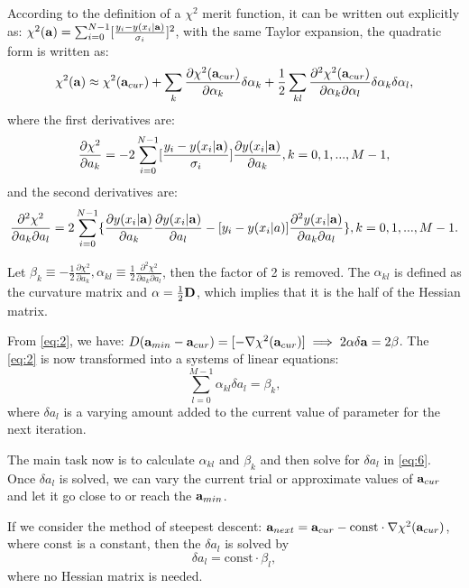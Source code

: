 According to the definition of a $\chi^2$ merit function, it can be written out explicitly as:
$\chi^2({\bf a})=\sum_{i=0}^{N-1}[\frac{y_i-y(x_i|{\bf a})}{\sigma_i}]^2$, with the same Taylor expansion, the quadratic form is written as:
\begin{equation}\label{eq:3}
\chi^2({\bf a})\approx\chi^2({\bf a}_{cur})+\sum_k\frac{\partial \chi^2({\bf a}_{cur})}{\partial \alpha_k}\delta\alpha_k+\frac{1}{2}\sum_{kl}\frac{\partial^2\chi^2({\bf a}_{cur})}{\partial\alpha_k\partial\alpha_l}\delta\alpha_k\delta\alpha_l, 
\end{equation}
where the first derivatives are:
\begin{equation}\label{eq:4}
\frac{\partial \chi^2}{\partial a_k}=-2\sum_{i=0}^{N-1}[\frac{y_i-y(x_i|{\bf a})}{\sigma_i}]\frac{\partial y(x_i|{\bf a})}{\partial a_k}, k = 0,1,...,M-1,
\end{equation}
and the second derivatives are:
\begin{equation}\label{eq:5}
\frac{\partial^2 \chi^2}{\partial a_k\partial a_l}=2\sum_{i=0}^{N-1}\{\frac{\partial y(x_i|{\bf a})}{\partial a_k}\frac{\partial y(x_i|{\bf a})}{\partial a_l}-[y_i-y(x_i|a)]\frac{\partial^2 y(x_i|{\bf a})}{\partial a_k\partial a_l}\}, k = 0, 1, ..., M-1.
\end{equation}

Let $\beta_k\equiv-\frac{1}{2}\frac{\partial\chi^2}{\partial a_k}, \alpha_{kl}\equiv \frac{1}{2}\frac{\partial^2\chi^2}{\partial a_k\partial a_l}$, then the factor of 2 is removed. The $\alpha_{kl}$ is defined as the curvature matrix and ${\bf \alpha}=\frac{1}{2}{\bf D}$, which implies that it is the half of the Hessian matrix.

From \ref{eq:2}, we have: $D({\bf a}_{min}-{\bf a}_{cur}) = [-\nabla\chi^2({\bf a}_{cur})]\implies 2{\bf\alpha\delta a}= 2{\bf\beta}$. The \ref{eq:2} is now transformed into a systems of linear equations:
\begin{equation}\label{eq:6}
\sum_{l=0}^{M-1}\alpha_{kl}\delta a_l = \beta_k,
\end{equation} where $\delta a_l$ is 
a varying amount added to the current value of parameter for the next iteration. 

The main task now is to calculate $\alpha_{kl}$ and $\beta_k$ and then solve for $\delta a_l$ in \ref{eq:6}. Once $\delta a_l$ is solved, we can vary the current trial or approximate values of ${\bf a}_{cur}$ and let it go close to or reach the ${\bf a}_{min}$.

If we consider the method of steepest descent: ${\bf a}_{next}={\bf a}_{cur}-\mathrm{const}\cdot\nabla\chi^2({\bf a}_{cur})$, where $\mathrm{const}$ is a constant, then the $\delta a_l$ is solved by \begin{equation}\label{eq:7}
\delta a_l=\mathrm{const}\cdot \beta_l, 
\end{equation}
where no Hessian matrix is needed.

